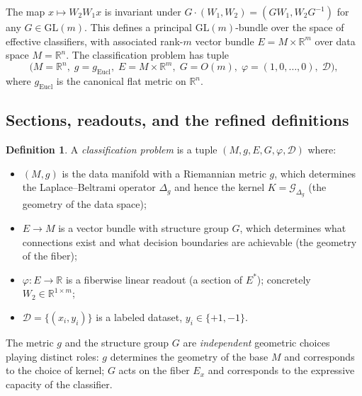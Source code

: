 \documentclass[11pt, a4paper]{article}
\theoremstyle{plain}
\theoremstyle{definition}
\newtheorem{definition}[theorem]{Definition}
\newcommand{\R}{\mathbb{R}}
\newcommand{\GL}{\mathrm{GL}}
\newcommand{\Gr}{\mathcal{G}}   %
\begin{document}
The map $x \mapsto W_2 W_1 x$ is invariant under $G\cdot(W_1,W_2)=(GW_1,W_2G^{-1})$
for any $G\in\GL(m)$. This defines a principal $\GL(m)$-bundle over the space of
effective classifiers, with associated rank-$m$ vector bundle $E = M\times\R^m$
over data space $M = \R^n$. The classification problem has tuple
\[
  \bigl(M = \R^n,\; g = g_{\mathrm{Eucl}},\; E = M\times\R^m,\;
        G = O(m),\; \varphi = (1,0,\ldots,0),\; \mathcal{D}\bigr),
\]
where $g_{\mathrm{Eucl}}$ is the canonical flat metric on $\R^n$.

\subsection{Sections, readouts, and the refined definitions}

\begin{definition}\label{def:cp}
A \emph{classification problem} is a tuple $(M, g, E, G, \varphi, \mathcal{D})$
where:
\begin{itemize}[itemsep=2pt]
  \item $(M, g)$ is the data manifold with a Riemannian metric $g$, which
        determines the Laplace--Beltrami operator $\Delta_g$ and hence the kernel
        $K = \Gr_{\Delta_g}$ (the geometry of the data space);
  \item $E \to M$ is a vector bundle with structure group $G$, which determines
        what connections exist and what decision boundaries are achievable
        (the geometry of the fiber);
  \item $\varphi: E\to\R$ is a fiberwise linear readout (a section of $E^*$);
        concretely $W_2 \in \R^{1\times m}$;
  \item $\mathcal{D} = \{(x_i, y_i)\}$ is a labeled dataset, $y_i\in\{+1,-1\}$.
\end{itemize}
The metric $g$ and the structure group $G$ are \emph{independent} geometric
choices playing distinct roles: $g$ determines the geometry of the base $M$ and corresponds to
the choice of kernel; $G$ acts on the fiber $E_x$ and corresponds to the
expressive capacity of the classifier.
\end{definition}
\end{document}
